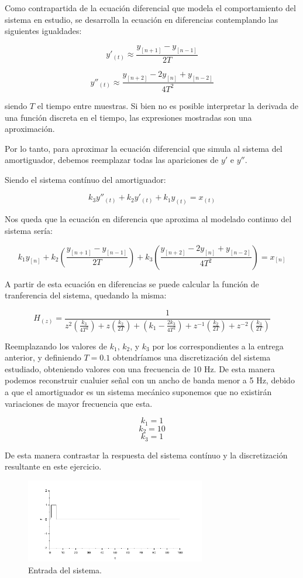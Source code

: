 \documentclass{article}
\begin{document}
Como contrapartida de la ecuación diferencial que modela el comportamiento del sistema en estudio, se desarrolla la ecuación en diferencias contemplando las siguientes igualdades:

$$y'_{(t)} \approx \frac{y_{[n+1]}-y_{[n-1]}}{2T}$$

$$y''_{(t)} \approx \frac{y_{[n+2]} - 2 y_{[n]} + y_{[n-2]}}{4T^2}$$

siendo $T$ el tiempo entre muestras. Si bien no es posible interpretar la derivada de una función discreta en el tiempo, las expresiones mostradas son una aproximación.


Por lo tanto, para aproximar la ecuación diferencial que simula al sistema del amortiguador, debemos reemplazar todas las apariciones de $y'$ e $y''$. 

Siendo el sistema contínuo del amortiguador:

$$k_3 y''_{(t)} + k_2 y'_{(t)} + k_1 y_{(t)} = x_{(t)}$$

Nos queda que la ecuación en diferencia que aproxima al modelado continuo del sistema sería:

$$k_1 y_{[n]} + k_2 \left(\frac{y_{[n+1]}-y_{[n-1]}}{2T}\right) + k_3 \left(\frac{y_{[n+2]} - 2 y_{[n]} + y_{[n-2]}}{4T^2}\right)= x_{[n]}$$

A partir de esta ecuación en diferencias se puede calcular la función de tranferencia del sistema, quedando la misma:

$$H_{(z)} = \frac{1}{z^2 \left(\frac{k_3}{4T^2}\right) + z \left(\frac{k_2}{2T}\right) + \left(k_1-\frac{2k_3}{4T^2}\right) + z^{-1} \left(\frac{k_2}{2T}\right) + z^{-2} \left(\frac{k_3}{2T}\right)} $$


Reemplazando los valores de $k_1$, $k_2$, y $k_3$ por los correspondientes a la entrega anterior, y definiendo $T=0.1$ obtendríamos una discretización del sistema estudiado, obteniendo valores con una frecuencia de 10 Hz. De esta manera podemos reconstruir cualuier señal con un ancho de banda menor a 5 Hz, debido a que el amortiguador es un sistema mecánico suponemos que  no existirán variaciones de mayor frecuencia que esta.

$$ k_1 =1$$
$$k_2 =10$$
$$k_3=1$$

De esta manera contrastar la respuesta del sistema contínuo y la discretización resultante en este ejercicio.

        \begin{figure}[h!]
            \centering
            \includegraphics[width=0.7\textwidth]{amortiguador_entrada.png}
            \caption{Entrada del sistema.}
            \label{entrada}
        \end{figure}
        
\end{document}
